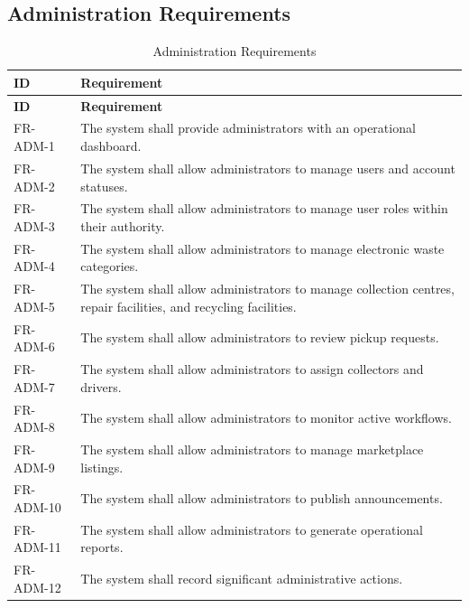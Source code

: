 \subsection{Administration Requirements}
\begin{longtable}{@{}p{2.4cm}p{11cm}@{}}
\caption{Administration Requirements} \label{tab:fr-adm} \\
\toprule \textbf{ID} & \textbf{Requirement} \\ \midrule
\endfirsthead
\toprule \textbf{ID} & \textbf{Requirement} \\ \midrule
\endhead
FR-ADM-1 & The system shall provide administrators with an operational dashboard. \\
FR-ADM-2 & The system shall allow administrators to manage users and account statuses. \\
FR-ADM-3 & The system shall allow administrators to manage user roles within their authority. \\
FR-ADM-4 & The system shall allow administrators to manage electronic waste categories. \\
FR-ADM-5 & The system shall allow administrators to manage collection centres, repair facilities, and recycling facilities. \\
FR-ADM-6 & The system shall allow administrators to review pickup requests. \\
FR-ADM-7 & The system shall allow administrators to assign collectors and drivers. \\
FR-ADM-8 & The system shall allow administrators to monitor active workflows. \\
FR-ADM-9 & The system shall allow administrators to manage marketplace listings. \\
FR-ADM-10 & The system shall allow administrators to publish announcements. \\
FR-ADM-11 & The system shall allow administrators to generate operational reports. \\
FR-ADM-12 & The system shall record significant administrative actions. \\
\bottomrule
\end{longtable}

